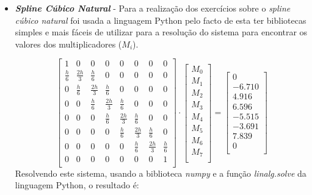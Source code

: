 \documentclass[12pt, letterpaper,fleqn]{article}
\begin{document}
\begin{itemize}
    \item \textbf{\textit{Spline Cúbico Natural}} - Para a realização dos exercícios sobre o \textit{spline cúbico natural} foi usada a linguagem Python pelo facto de esta ter bibliotecas simples e mais fáceis de utilizar para a resolução do sistema para encontrar os valores dos multiplicadores (\textit{$M_i$}).

    $$
    \begin{bmatrix}
    1 & 0 & 0 & 0 & 0 & 0 & 0 & 0 \\[6pt]
    \frac{h}{6} & \frac{2h}{3} & \frac{h}{6} & 0 & 0 & 0 & 0 & 0 \\[6pt]
    0 & \frac{h}{6} & \frac{2h}{3} & \frac{h}{6} & 0 & 0 & 0 & 0 \\[6pt]
    0 & 0 & \frac{h}{6} & \frac{2h}{3} & \frac{h}{6} & 0 & 0 & 0 \\[6pt]
    0 & 0 & 0 & \frac{h}{6} & \frac{2h}{3} & \frac{h}{6} & 0 & 0 \\[6pt]
    0 & 0 & 0 & 0 & \frac{h}{6} & \frac{2h}{3} & \frac{h}{6} & 0 \\[6pt]
    0 & 0 & 0 & 0 & 0 & \frac{h}{6} & \frac{2h}{3} & \frac{h}{6} \\[6pt]
    0 & 0 & 0 & 0 & 0 & 0 & 0 & 1 \\
    \end{bmatrix}
    \cdot 
    \begin{bmatrix}
    M_0 \\[6pt]
    M_1 \\[6pt]
    M_2 \\[6pt]
    M_3 \\[6pt]
    M_4 \\[6pt]
    M_5 \\[6pt]
    M_6 \\[6pt]
    M_7 \\[6pt]
    \end{bmatrix}
    =
    \begin{bmatrix}
    0 \\[6pt] 
    -6.710 \\[6pt]
    4.916  \\[6pt]
    6.596  \\[6pt]
    -5.515 \\[6pt]
    -3.691 \\[6pt]
    7.839  \\[6pt]
    0 \\[6pt]
    \end{bmatrix}
    $$
    Resolvendo este sistema, usando a biblioteca \textit{numpy} e a função \textit{linalg.solve} da linguagem Python, o resultado é:

\end{itemize}
\end{document}
